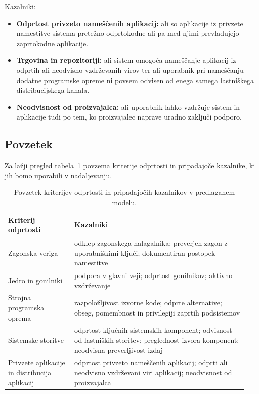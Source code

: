 \documentclass[a4paper,12pt,openright]{book}
\begin{document}
Kazalniki:
\begin{itemize}
  \item \textbf{Odprtost privzeto nameščenih aplikacij:} ali so aplikacije iz privzete namestitve sistema pretežno odprtokodne ali pa med njimi prevladujejo zaprtokodne aplikacije.
  \item \textbf{Trgovina in repozitoriji:} ali sistem omogoča nameščanje aplikacij iz odprtih ali neodvisno vzdrževanih virov ter ali uporabnik pri nameščanju dodatne programske opreme ni povsem odvisen od enega samega lastniškega distribucijskega kanala.
  \item \textbf{Neodvisnost od proizvajalca:} ali uporabnik lahko vzdržuje sistem in aplikacije tudi po tem, ko proizvajalec naprave uradno zaključi podporo.
\end{itemize}

\subsection{Povzetek}

Za lažji pregled tabela~\ref{tab:model_povzetek_slojev} povzema kriterije odprtosti in pripadajoče kazalnike, ki jih bomo uporabili v nadaljevanju.

\begin{table}[htb]
\centering
\begin{tabular}{p{0.26\linewidth} p{0.68\linewidth}}
\hline
\textbf{Kriterij odprtosti} & \textbf{Kazalniki} \\
\hline
Zagonska veriga &
odklep zagonskega nalagalnika; preverjen zagon z uporabniškimi ključi; dokumentiran postopek namestitve \\
Jedro in gonilniki &
podpora v glavni veji; odprtost gonilnikov; aktivno vzdrževanje \\
Strojna programska oprema &
razpoložljivost izvorne kode; odprte alternative; obseg, pomembnost in privilegiji zaprtih podsistemov \\
Sistemske storitve &
odprtost ključnih sistemskih komponent; odvisnost od lastniških storitev; preglednost izvora komponent; neodvisna preverljivost izdaj \\
Privzete aplikacije in distribucija aplikacij &
odprtost privzeto nameščenih aplikacij; odprti ali neodvisno vzdrževani viri aplikacij; neodvisnost od proizvajalca \\
\hline
\end{tabular}
\caption{Povzetek kriterijev odprtosti in pripadajočih kazalnikov v predlaganem modelu.}
\label{tab:model_povzetek_slojev}
\end{table}
\end{document}
